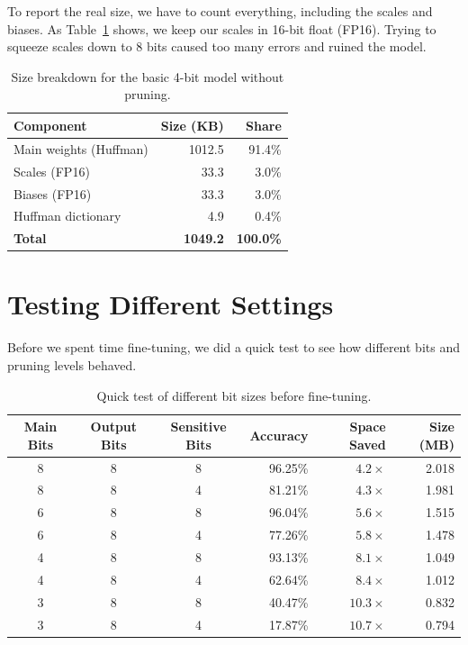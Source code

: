 \documentclass[11pt,a4paper]{article}
\begin{document}
To report the real size, we have to count everything, including the scales and biases. As Table~\ref{tab:overhead} shows, we keep our scales in 16-bit float (FP16). Trying to squeeze scales down to 8 bits caused too many errors and ruined the model.

\begin{table}[ht]
\centering
\begin{tabular}{@{}lrr@{}}
\toprule
\textbf{Component} & \textbf{Size (KB)} & \textbf{Share} \\
\midrule
Main weights (Huffman) & 1012.5 & 91.4\% \\
Scales (FP16) & 33.3 & 3.0\% \\
Biases (FP16) & 33.3 & 3.0\% \\
Huffman dictionary & 4.9 & 0.4\% \\
\midrule
\textbf{Total} & \textbf{1049.2} & \textbf{100.0\%} \\
\bottomrule
\end{tabular}
\caption{Size breakdown for the basic 4-bit model without pruning.}
\label{tab:overhead}
\end{table}


\section{Testing Different Settings}

\label{sec:q3}


Before we spent time fine-tuning, we did a quick test to see how different bits and pruning levels behaved.

\begin{table}[ht]
\centering
\small
\begin{tabular}{@{}cccrrr@{}}
\toprule
\textbf{Main Bits} & \textbf{Output Bits} & \textbf{Sensitive Bits} & \textbf{Accuracy} & \textbf{Space Saved} & \textbf{Size (MB)} \\
\midrule
8 & 8 & 8 & 96.25\% & $4.2\times$ & 2.018 \\
8 & 8 & 4 & 81.21\% & $4.3\times$ & 1.981 \\
6 & 8 & 8 & 96.04\% & $5.6\times$ & 1.515 \\
6 & 8 & 4 & 77.26\% & $5.8\times$ & 1.478 \\
4 & 8 & 8 & 93.13\% & $8.1\times$ & 1.049 \\
4 & 8 & 4 & 62.64\% & $8.4\times$ & 1.012 \\
3 & 8 & 8 & 40.47\% & $10.3\times$ & 0.832 \\
3 & 8 & 4 & 17.87\% & $10.7\times$ & 0.794 \\
\bottomrule
\end{tabular}
\caption{Quick test of different bit sizes before fine-tuning.}
\label{tab:sweep}
\end{table}
\end{document}
